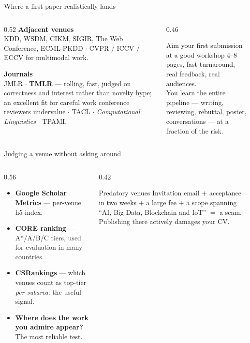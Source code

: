 \documentclass[aspectratio=169,11pt]{beamer}
\newcommand{\key}[1]{\textbf{\color{brand}#1}}
\begin{document}
\begin{frame}{Where a first paper realistically lands}
\begin{columns}[T]
\begin{column}{0.52\textwidth}
\textbf{Adjacent venues}\\
\footnotesize KDD, WSDM, CIKM, SIGIR, The Web Conference, ECML-PKDD $\cdot$
CVPR / ICCV / ECCV for multimodal work.
\medskip

\normalsize\textbf{Journals}\\
\footnotesize JMLR $\cdot$ \key{TMLR} --- rolling, fast, judged on correctness
and interest rather than novelty hype; an excellent fit for careful work
conference reviewers undervalue $\cdot$ TACL $\cdot$ \emph{Computational
Linguistics} $\cdot$ TPAMI.
\end{column}
\begin{column}{0.46\textwidth}
\begin{block}{Aim your first submission at a good workshop}
\footnotesize
4--8 pages, fast turnaround, real feedback, real audiences.\\[4pt]
You learn the entire pipeline --- writing, reviewing, rebuttal, poster,
conversations --- at a fraction of the risk.
\end{block}
\end{column}
\end{columns}
\end{frame}

\begin{frame}{Judging a venue without asking around}
\begin{columns}[T]
\begin{column}{0.56\textwidth}
\begin{itemize}
  \item \key{Google Scholar Metrics} --- per-venue h5-index.
  \item \key{CORE ranking} --- A*/A/B/C tiers, used for evaluation in many
        countries.
  \item \key{CSRankings} --- which venues count as top-tier \emph{per subarea}:
        the useful signal.
  \item \key{Where does the work you admire appear?} The most reliable test.
\end{itemize}
\end{column}
\begin{column}{0.42\textwidth}
\begin{alertblock}{Predatory venues}
\footnotesize
Invitation email $+$ acceptance in two weeks $+$ a large fee $+$ a scope
spanning ``AI, Big Data, Blockchain and IoT'' $=$ a scam.\\[4pt]
Publishing there actively damages your CV.
\end{alertblock}
\end{column}
\end{columns}
\end{frame}
\end{document}
